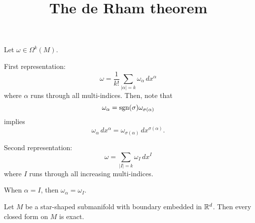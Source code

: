 \documentclass{../exp}
\title{The de Rham theorem}
\begin{document}
\maketitle


Let $\omega\in\Omega^k(M)$.

First representation:
\[\omega=\frac1{k!}\sum_{|\alpha|=k}\omega_\alpha\,dx^\alpha\]
where $\alpha$ runs through all multi-indices.
Then, note that
\[\omega_\alpha=\operatorname{sgn}(\sigma)\omega_{\sigma(\alpha)}\]
implies
\[\omega_\alpha\,dx^\alpha=\omega_{\sigma(\alpha)}\,dx^{\sigma(\alpha)}.\]

Second representation:
\[\omega=\sum_{|I|=k}\omega_I\,dx^I\]
where $I$ runs through all increasing multi-indices.

When $\alpha=I$, then $\omega_\alpha=\omega_I$.

\begin{thm}
Let $M$ be a star-shaped submanifold with boundary embedded in $\mathbb{R}^d$.
Then every closed form on $M$ is exact.
\end{thm}
\end{document}
